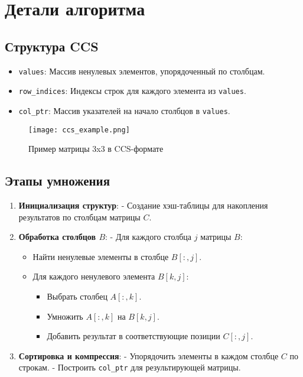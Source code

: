 \documentclass[a4paper,12pt]{article}
\begin{document}
\section{Детали алгоритма}
\subsection{Структура CCS}
\begin{itemize}
\item \texttt{values}: Массив ненулевых элементов, упорядоченный по столбцам.
\item \texttt{row\_indices}: Индексы строк для каждого элемента из \texttt{values}.
\item \texttt{col\_ptr}: Массив указателей на начало столбцов в \texttt{values}.
\end{itemize}

\begin{figure}[H]
\centering
\texttt{[image: ccs\_example.png]}
\caption{Пример матрицы 3x3 в CCS-формате}
\end{figure}

\subsection{Этапы умножения}
\begin{enumerate}
\item \textbf{Инициализация структур}: 
  - Создание хэш-таблицы для накопления результатов по столбцам матрицы \( C \).
  
\item \textbf{Обработка столбцов \( B \)}:
  - Для каждого столбца \( j \) матрицы \( B \):
  \begin{itemize}
  \item Найти ненулевые элементы в столбце \( B[:,j] \).
  \item Для каждого ненулевого элемента \( B[k,j] \):
    \begin{itemize}
    \item Выбрать столбец \( A[:,k] \).
    \item Умножить \( A[:,k] \) на \( B[k,j] \).
    \item Добавить результат в соответствующие позиции \( C[:,j] \).
    \end{itemize}
  \end{itemize}
  
\item \textbf{Сортировка и компрессия}:
  - Упорядочить элементы в каждом столбце \( C \) по строкам.
  - Построить \texttt{col\_ptr} для результирующей матрицы.
\end{enumerate}
\end{document}
